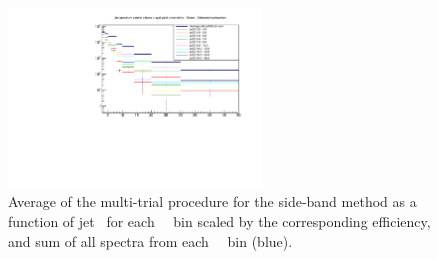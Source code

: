 \begin{figure}[bth]
\begin{center}
\includegraphics[width=0.6\textwidth]{pPbcuts_2sig/multi_trial/cDistrAllAvgs.pdf}
\caption{Average of the multi-trial procedure for the side-band method as a function of jet \pt\ for each \Dzero\ \pt\ bin scaled by the corresponding efficiency, and sum of all spectra from each \Dzero\ \pt\ bin (blue).} 
\label{fig:MultiTrialSB_trials_pPB_Dzero}
\end{center}
\end{figure}

